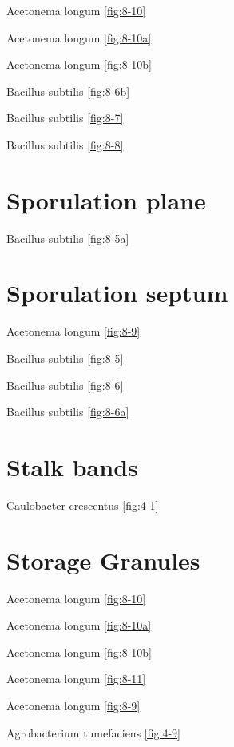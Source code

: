 \documentclass[]{tufte-book}
\begin{document}
Acetonema longum \ref{fig:8-10}

Acetonema longum \ref{fig:8-10a}

Acetonema longum \ref{fig:8-10b}

Bacillus subtilis \ref{fig:8-6b}

Bacillus subtilis \ref{fig:8-7}

Bacillus subtilis \ref{fig:8-8}

\hypertarget{sporulation-plane}{%
\section*{Sporulation plane}\label{sporulation-plane}}

Bacillus subtilis \ref{fig:8-5a}

\hypertarget{sporulation-septum}{%
\section*{Sporulation septum}\label{sporulation-septum}}

Acetonema longum \ref{fig:8-9}

Bacillus subtilis \ref{fig:8-5}

Bacillus subtilis \ref{fig:8-6}

Bacillus subtilis \ref{fig:8-6a}

\hypertarget{stalk-bands}{%
\section*{Stalk bands}\label{stalk-bands}}

Caulobacter crescentus \ref{fig:4-1}

\hypertarget{storage-granules}{%
\section*{Storage Granules}\label{storage-granules}}

Acetonema longum \ref{fig:8-10}

Acetonema longum \ref{fig:8-10a}

Acetonema longum \ref{fig:8-10b}

Acetonema longum \ref{fig:8-11}

Acetonema longum \ref{fig:8-9}

Agrobacterium tumefaciens \ref{fig:4-9}
\end{document}
